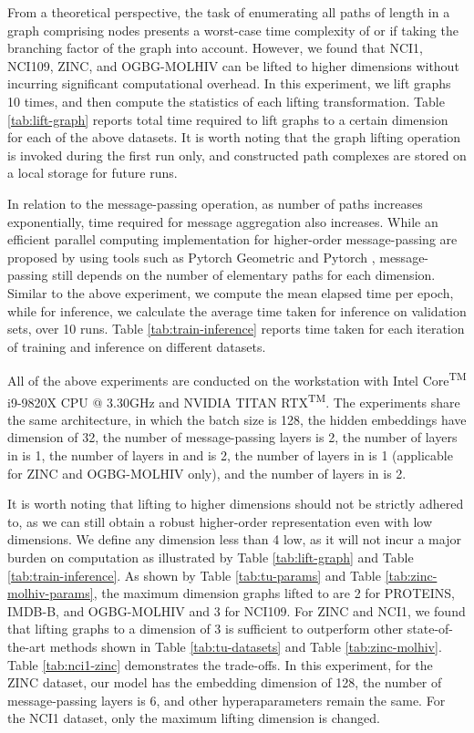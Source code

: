 \documentclass[letterpaper]{article} \usepackage{aaai24}  \usepackage{times}  \usepackage{helvet}  \usepackage{courier}  \usepackage[hyphens]{url}  \usepackage{graphicx} \urlstyle{rm} \def\UrlFont{\rm}  \usepackage{natbib}  \usepackage{caption} \frenchspacing  \setlength{\pdfpagewidth}{8.5in} \setlength{\pdfpageheight}{11in} \usepackage{algorithm}
\begin{document}
From a theoretical perspective, the task of enumerating all paths of length  in a graph comprising  nodes presents a worst-case time complexity of  or  if taking the branching factor  of the graph into account. However, we found that NCI1, NCI109, ZINC, and OGBG-MOLHIV can be lifted to higher dimensions without incurring significant computational overhead. In this experiment, we lift graphs 10 times, and then compute the statistics of each lifting transformation. Table \ref{tab:lift-graph} reports total time required to lift graphs to a certain dimension for each of the above datasets. It is worth noting that the graph lifting operation is invoked during the first run only, and constructed path complexes are stored on a local storage for future runs.

In relation to the message-passing operation, as number of paths increases exponentially, time required for message aggregation also increases. While an efficient parallel computing implementation for higher-order message-passing are proposed by \cite{bodnar_weisfeiler_2021, bodnar_weisfeiler_2022} using tools such as Pytorch Geometric \cite{fey_fast_2019} and Pytorch \cite{paszke_pytorch_2019}, message-passing still depends on the number of elementary paths for each dimension. Similar to the above experiment, we compute the mean elapsed time per epoch, while for inference, we calculate the average time taken for inference on validation sets, over 10 runs. Table \ref{tab:train-inference} reports time taken for each iteration of training and inference on different datasets.

All of the above experiments are conducted on the workstation with Intel\textsuperscript{\textregistered} Core\textsuperscript{TM} i9-9820X CPU @ 3.30GHz and NVIDIA\textsuperscript{\textregistered} TITAN RTX\textsuperscript{TM}. The experiments share the same architecture, in which the batch size is 128, the hidden embeddings have dimension of 32, the number of message-passing layers is 2, the number of layers in  is 1, the number of layers in  and  is 2, the number of layers in  is 1 (applicable for ZINC and OGBG-MOLHIV only), and the number of layers in  is 2.

It is worth noting that lifting to higher dimensions should not be strictly adhered to, as we can still obtain a robust higher-order representation even with low dimensions. We define any dimension less than 4 low, as it will not incur a major burden on computation as illustrated by Table \ref{tab:lift-graph} and Table \ref{tab:train-inference}. As shown by Table \ref{tab:tu-params} and Table \ref{tab:zinc-molhiv-params}, the maximum dimension graphs lifted to are 2 for PROTEINS, IMDB-B, and OGBG-MOLHIV and 3 for NCI109. For ZINC and NCI1, we found that lifting graphs to a dimension of 3 is sufficient to outperform other state-of-the-art methods shown in Table \ref{tab:tu-datasets} and Table \ref{tab:zinc-molhiv}. Table \ref{tab:nci1-zinc} demonstrates the trade-offs. In this experiment, for the ZINC dataset, our model has the embedding dimension of 128, the number of message-passing layers is 6, and other hyperaparameters remain the same. For the NCI1 dataset, only the maximum lifting dimension is changed.
\end{document}
